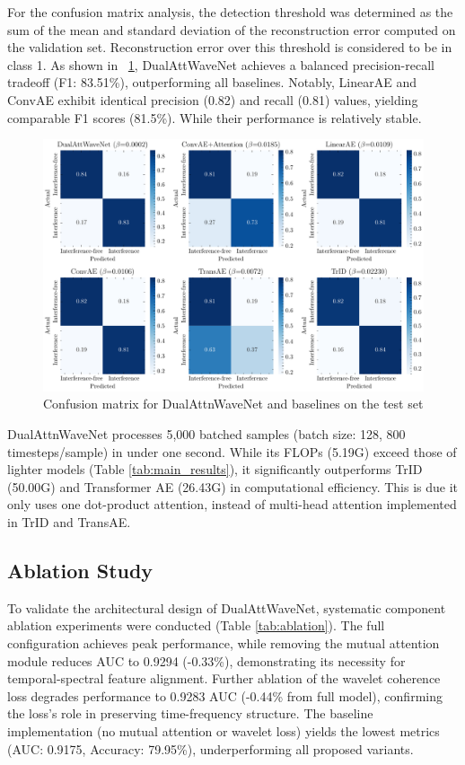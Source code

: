 \documentclass[conference]{IEEEtran}
\begin{document}
For the confusion matrix analysis, the detection threshold was determined as the sum of the mean and standard deviation of the reconstruction error computed on the validation set. Reconstruction error over this threshold is considered to be in class 1. As shown in \figurename~\ref{fig:confusion_matrix}, DualAttWaveNet achieves a balanced precision-recall tradeoff (F1: 83.51\%), outperforming all baselines. Notably, LinearAE and ConvAE exhibit identical precision (0.82) and recall (0.81) values, yielding comparable F1 scores (81.5\%). While their performance is relatively stable. 

\begin{figure}[tb]
    \centering
    \includegraphics[width=\linewidth]{confusion.pdf}
    \caption{Confusion matrix for DualAttnWaveNet and baselines on the test set}
    \label{fig:confusion_matrix}
\end{figure}

DualAttnWaveNet processes 5,000 batched samples (batch size: 128, 800 timesteps/sample) in under one second. While its FLOPs (5.19G) exceed those of lighter models (Table \ref{tab:main_results}), it significantly outperforms TrID (50.00G) and Transformer AE (26.43G) in computational efficiency. This is due it only uses one dot-product attention, instead of multi-head attention implemented in TrID and TransAE.


\subsection{Ablation Study}

To validate the architectural design of DualAttWaveNet, systematic component ablation experiments were conducted (Table \ref{tab:ablation}). The full configuration achieves peak performance, while removing the mutual attention module reduces AUC to 0.9294 (-0.33\%), demonstrating its necessity for temporal-spectral feature alignment. Further ablation of the wavelet coherence loss degrades performance to 0.9283 AUC (-0.44\% from full model), confirming the loss’s role in preserving time-frequency structure. The baseline implementation (no mutual attention or wavelet loss) yields the lowest metrics (AUC: 0.9175, Accuracy: 79.95\%), underperforming all proposed variants.
\end{document}
